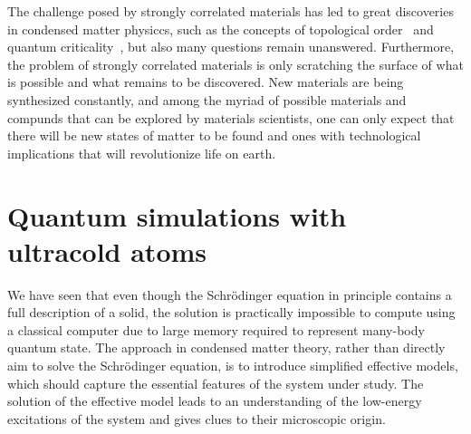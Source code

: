 \documentclass[oneside,11pt]{memoir}
\begin{document}
The challenge posed by strongly correlated materials has led to great
discoveries in condensed matter physiccs, such as the concepts of topological
order~\cite{wen1990topological} and quantum
criticality~\cite{PhysRevB.14.1165,sachdev2011quantum}, but also many questions
remain unanswered.  Furthermore, the problem of strongly correlated materials
is only scratching the surface of what is possible and what remains to be
discovered.  New materials are being synthesized constantly, and among the
myriad of possible materials and compunds that can be explored by materials
scientists, one can only expect that there will be new states of matter to be
found and ones with technological implications that will revolutionize life on
earth.  


\section{Quantum simulations with ultracold atoms}

We have seen that even though the Schr\"{o}dinger equation in principle
contains a full description of a solid,  the solution is practically impossible
to compute using a classical computer due to large memory required to represent
many-body quantum state.   
The approach in condensed matter theory, rather than directly aim to solve the
Schr\"{o}dinger equation, is to introduce simplified effective models, which
should capture the essential features of the system under study.  The solution
of the effective model leads to an understanding of the low-energy excitations
of the system and gives clues to their microscopic origin.   
\end{document}
